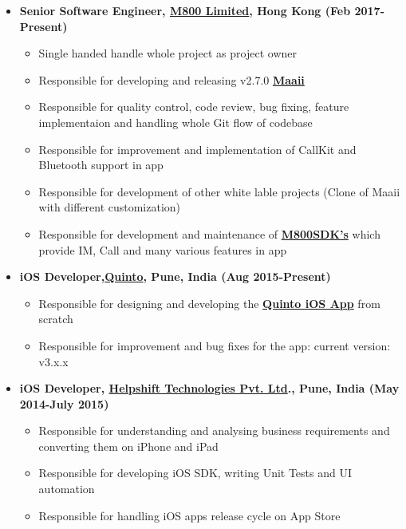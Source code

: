 \documentclass[letterpaper,11pt]{article}
\newcommand{\resitem}[1]{\item #1 \vspace{-2pt}}
\begin{document}
\begin{itemize}

\resitem {{\bfseries Senior Software Engineer, \href{http://www.m800.com} {M800 Limited}, Hong Kong (Feb 2017-Present)}}
		{ \footnotesize
		\begin{itemize}
			\resitem{Single handed handle whole project as project owner}
			\resitem{Responsible for developing and releasing v2.7.0  \href{https://itunes.apple.com/hk/app/id488051175}{\bfseries Maaii}}
			\resitem{Responsible for quality control, code review, bug fixing, feature implementaion and handling whole Git flow of codebase}
			\resitem{Responsible for improvement and implementation of CallKit and Bluetooth support in app}
			\resitem{Responsible for development of other white lable projects (Clone of Maaii with different customization)}
			\resitem{Responsible for development and maintenance of \href{https://developer.m800.com/}{\bfseries M800SDK's}  which provide IM, Call and many various features in app}
		\end{itemize}
		}
\resitem {{\bfseries iOS Developer,\href{http://quintoapp.com} {Quinto}, Pune, India (Aug 2015-Present)}}
		{ \footnotesize
		\begin{itemize}
			\resitem{Responsible for designing and developing the \href{https://itunes.apple.com/in/app/id912305961}{\bfseries Quinto iOS App} from scratch}
			\resitem{Responsible for improvement and bug fixes for the app: current version: v3.x.x}
		\end{itemize}
		}
\resitem {{\bfseries iOS Developer, \href{https://helpshift.com}{\bfseries Helpshift Technologies Pvt. Ltd}., Pune, India (May 2014-July 2015)}}
		{ \footnotesize
		\begin{itemize}
			\resitem{Responsible for understanding and analysing business requirements and converting them on iPhone and iPad}
			\resitem{Responsible for developing iOS SDK, writing Unit Tests and UI automation}
			\resitem{Responsible for handling iOS apps release cycle on App Store}
		\end{itemize}
		}
\end{itemize}  %
\end{document}
